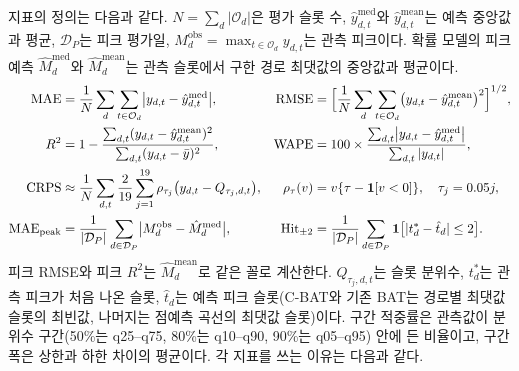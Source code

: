 지표의 정의는 다음과 같다. $N=\sum_d|\mathcal O_d|$은 평가 슬롯 수, $\hat y^{\mathrm{med}}_{d,t}$와 $\hat y^{\mathrm{mean}}_{d,t}$는 예측 중앙값과 평균, $\mathcal D_P$는 피크 평가일, $M^{\mathrm{obs}}_d=\max_{t\in\mathcal O_d}y_{d,t}$는 관측 피크이다. 확률 모델의 피크 예측 $\hat M^{\mathrm{med}}_d$와 $\hat M^{\mathrm{mean}}_d$는 관측 슬롯에서 구한 경로 최댓값의 중앙값과 평균이다.
\begin{align}
\mathrm{MAE} &= \frac1N\sum_{d}\sum_{t\in\mathcal O_d}\bigl|y_{d,t}-\hat y^{\mathrm{med}}_{d,t}\bigr|, &
\mathrm{RMSE} &= \Bigl[\frac1N\sum_{d}\sum_{t\in\mathcal O_d}\bigl(y_{d,t}-\hat y^{\mathrm{mean}}_{d,t}\bigr)^2\Bigr]^{1/2}, \notag\\
R^2 &= 1-\frac{\sum_{d,t}(y_{d,t}-\hat y^{\mathrm{mean}}_{d,t})^2}{\sum_{d,t}(y_{d,t}-\bar y)^2}, &
\mathrm{WAPE} &= 100\times\frac{\sum_{d,t}\bigl|y_{d,t}-\hat y^{\mathrm{med}}_{d,t}\bigr|}{\sum_{d,t}|y_{d,t}|}, \label{eq:ch2-metrics}\\
\mathrm{CRPS} &\approx \frac1N\sum_{d,t}\frac{2}{19}\sum_{j=1}^{19}\rho_{\tau_j}\bigl(y_{d,t}-Q_{\tau_j,d,t}\bigr), &
\rho_\tau(v) &= v\{\tau-\mathbf 1[v<0]\},\quad \tau_j=0.05j, \notag\\
\mathrm{MAE}_{\mathrm{peak}} &= \frac1{|\mathcal D_P|}\sum_{d\in\mathcal D_P}\bigl|M^{\mathrm{obs}}_d-\hat M^{\mathrm{med}}_d\bigr|, &
\mathrm{Hit}_{\pm2} &= \frac1{|\mathcal D_P|}\sum_{d\in\mathcal D_P}\mathbf 1\bigl[|t^{*}_d-\hat t_d|\le2\bigr]. \notag
\end{align}
피크 RMSE와 피크 $R^2$는 $\hat M^{\mathrm{mean}}_d$로 같은 꼴로 계산한다. $Q_{\tau_j,d,t}$는 슬롯 분위수, $t^{*}_d$는 관측 피크가 처음 나온 슬롯, $\hat t_d$는 예측 피크 슬롯(C-BAT와 기존 BAT는 경로별 최댓값 슬롯의 최빈값, 나머지는 점예측 곡선의 최댓값 슬롯)이다. 구간 적중률은 관측값이 분위수 구간(50\%는 q25--q75, 80\%는 q10--q90, 90\%는 q05--q95) 안에 든 비율이고, 구간 폭은 상한과 하한 차이의 평균이다. 각 지표를 쓰는 이유는 다음과 같다.
